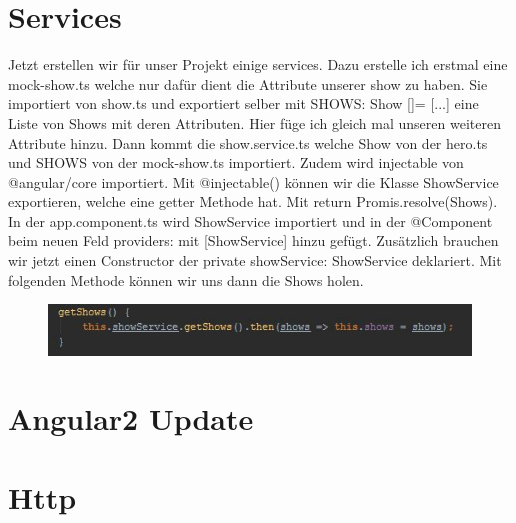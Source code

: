 \documentclass[12pt,titlepage]{article}
\begin{document}
\newpage
\section{Services}
Jetzt erstellen wir für unser Projekt einige services. Dazu erstelle ich erstmal eine mock-show.ts welche nur dafür dient die Attribute unserer show zu haben. Sie importiert von show.ts und exportiert selber mit SHOWS: Show []= [...] eine Liste von Shows mit deren Attributen. Hier füge ich gleich mal unseren weiteren Attribute hinzu. Dann kommt die show.service.ts welche Show von der hero.ts und SHOWS von der mock-show.ts importiert. Zudem wird injectable von @angular/core importiert. Mit @injectable() können wir die Klasse ShowService exportieren, welche eine getter Methode hat. Mit return Promis.resolve(Shows). In der app.component.ts wird ShowService importiert und in der @Component beim neuen Feld providers: mit [ShowService] hinzu gefügt. Zusätzlich brauchen wir jetzt einen Constructor der private showService: ShowService deklariert. Mit folgenden Methode können wir uns dann die Shows holen.

\begin{figure}[h]
\begin{center}
\includegraphics[scale=1.2]{links/getShows.jpg}
\label{scene_intro_scale}
\end{center}
\end{figure}

\newpage
\section{Angular2 Update}

\newpage
\section{Http}

\newpage
\end{document}
